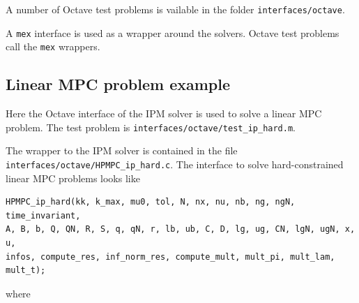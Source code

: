 \documentclass[a4paper]{report}
\begin{document}
A number of Octave test problems is vailable in the folder {\tt interfaces/octave}.

A {\tt mex} interface is used as a wrapper around the solvers.
Octave test problems call the {\tt mex} wrappers.

\subsection{Linear MPC problem example}

Here the Octave interface of the IPM solver is used to solve a linear MPC problem.
The test problem is {\tt interfaces/octave/test\_ip\_hard.m}.

The wrapper to the IPM solver is contained in the file {\tt interfaces/octave/HPMPC\_ip\_hard.c}.
The interface to solve hard-constrained linear MPC problems looks like
\begin{verbatim}
HPMPC_ip_hard(kk, k_max, mu0, tol, N, nx, nu, nb, ng, ngN, time_invariant, 
A, B, b, Q, QN, R, S, q, qN, r, lb, ub, C, D, lg, ug, CN, lgN, ugN, x, u, 
infos, compute_res, inf_norm_res, compute_mult, mult_pi, mult_lam, mult_t);
\end{verbatim}
where
\end{document}

